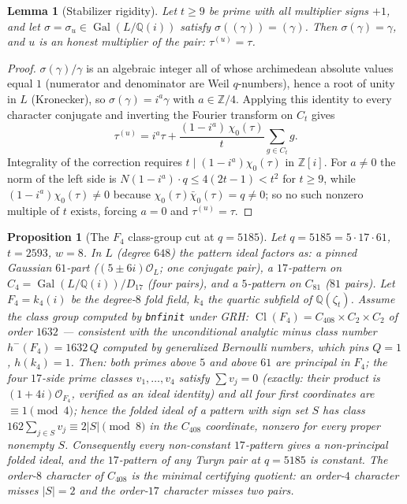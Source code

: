 \documentclass[11pt]{article}
\theoremstyle{plain}
\newtheorem{lemma}[theorem]{Lemma}
\newtheorem{proposition}[theorem]{Proposition}
\theoremstyle{definition}
\theoremstyle{remark}
\newcommand{\Z}{\mathbb Z}
\newcommand{\Q}{\mathbb Q}
\newcommand{\Cl}{\operatorname{Cl}}
\newcommand{\Gal}{\operatorname{Gal}}
\begin{document}
\begin{lemma}[Stabilizer rigidity]\label{lem:stabilizer-rigidity}
Let $t\ge9$ be prime with all multiplier signs $+1$, and let
$\sigma=\sigma_u\in\Gal(L/\Q(i))$ satisfy $\sigma((\gamma))=(\gamma)$.
Then $\sigma(\gamma)=\gamma$, and $u$ is an honest multiplier of the
pair: $\tau^{(u)}=\tau$.
\end{lemma}

\begin{proof}
$\sigma(\gamma)/\gamma$ is an algebraic integer all of whose archimedean
absolute values equal $1$ (numerator and denominator are Weil
$q$-numbers), hence a root of unity in $L$ (Kronecker), so
$\sigma(\gamma)=i^a\gamma$ with $a\in\Z/4$.  Applying this identity to
every character conjugate and inverting the Fourier transform on $C_t$
gives
\[
  \tau^{(u)}=i^a\tau+\frac{(1-i^a)\,\chi_0(\tau)}{t}\sum_{g\in C_t}g .
\]
Integrality of the correction requires $t\mid(1-i^a)\chi_0(\tau)$ in
$\Z[i]$.  For $a\ne0$ the norm of the left side is
$N(1-i^a)\cdot q\le4(2t-1)<t^2$ for $t\ge9$, while
$(1-i^a)\chi_0(\tau)\ne0$ because $\chi_0(\tau)\bar\chi_0(\tau)=q\ne0$;
so no such nonzero multiple of $t$ exists, forcing $a=0$ and
$\tau^{(u)}=\tau$.
\end{proof}

\begin{proposition}[The $F_4$ class-group cut at $q=5185$]
\label{prop:q5185-f4-cut}
Let $q=5185=5\cdot17\cdot61$, $t=2593$, $w=8$.  In $L$ (degree $648$)
the pattern ideal factors as: a pinned Gaussian $61$-part
($(5\pm6i)\mathcal O_L$; one conjugate pair), a $17$-pattern on
$C_4=\Gal(L/\Q(i))/D_{17}$ (four pairs), and a $5$-pattern on $C_{81}$
($81$ pairs).  Let $F_4=k_4(i)$ be the degree-$8$ fold field, $k_4$ the
quartic subfield of $\Q(\zeta_t)$.  Assume the class group computed by
\texttt{bnfinit} under GRH:
$\Cl(F_4)=C_{408}\times C_2\times C_2$ of order $1632$ --- consistent
with the \emph{unconditional} analytic minus class number
$h^-(F_4)=1632\,Q$ computed by generalized Bernoulli numbers, which pins
$Q=1$, $h(k_4)=1$.  Then: both primes above $5$ and above $61$ are
principal in $F_4$; the four $17$-side prime classes
$v_1,\dots,v_4$ satisfy $\sum v_j=0$ (exactly: their product is
$(1+4i)\mathcal O_{F_4}$, verified as an ideal identity) and all four
first coordinates are $\equiv1\pmod4$; hence the folded ideal of a
pattern with sign set $S$ has class $162\sum_{j\in S}v_j\equiv
2|S|\pmod 8$ in the $C_{408}$ coordinate, nonzero for every proper
nonempty $S$.  Consequently every non-constant $17$-pattern gives a
non-principal folded ideal, and the $17$-pattern of any Turyn pair at
$q=5185$ is constant.  The order-$8$ character of $C_{408}$ is the
minimal certifying quotient: an order-$4$ character misses $|S|=2$ and
the order-$17$ character misses two pairs.
\end{proposition}
\end{document}
